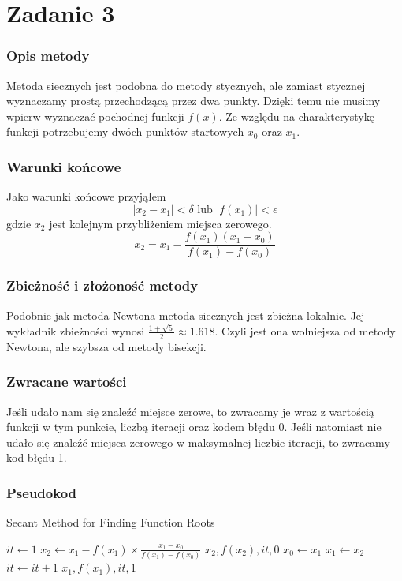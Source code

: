 \documentclass{article}
\begin{document}
\section*{Zadanie 3}
\subsubsection*{Opis metody}
Metoda siecznych jest podobna do metody stycznych, ale zamiast
stycznej wyznaczamy prostą przechodzącą przez dwa punkty. Dzięki
temu nie musimy wpierw wyznaczać pochodnej funkcji $f(x)$. Ze względu
na charakterystykę funkcji potrzebujemy dwóch punktów startowych
$x_0$ oraz $x_1$.

\subsubsection*{Warunki końcowe}
Jako warunki końcowe przyjąłem
\[
|x_2 - x_1| < \delta \text{{ lub }} |f(x_1)| < \epsilon
\]
gdzie $x_2$ jest kolejnym przybliżeniem miejsca zerowego.
\[
x_2 = x_1 - \frac{f(x_1)(x_1 - x_0)}{f(x_1) - f(x_0)}
\]

\subsubsection*{Zbieżność i złożoność metody}
Podobnie jak metoda Newtona metoda siecznych jest zbieżna lokalnie.
Jej wykładnik zbieżności wynosi $\frac{1 + \sqrt{5}}{2} \approx 1.618$.
Czyli jest ona wolniejsza od metody Newtona, ale szybsza od metody bisekcji.

\subsubsection*{Zwracane wartości}
Jeśli udało nam się znaleźć miejsce zerowe, to zwracamy je wraz z
wartością funkcji w tym punkcie, liczbą iteracji oraz kodem błędu 0.
Jeśli natomiast nie udało się znaleźć miejsca zerowego w maksymalnej
liczbie iteracji, to zwracamy kod błędu 1.

\subsubsection*{Pseudokod}
\begin{algorithm}[H]
  \caption{Secant Method for Finding Function Roots}
  \begin{algorithmic}[1]
      \State $it \gets 1$
          \State $x_2 \gets x_1 - f(x_1) \times \frac{x_1 - x_0}{f(x_1) - f(x_0)}$
              \State \Return $x_2, f(x_2), it, 0$
          \EndIf
          \State $x_0 \gets x_1$
          \State $x_1 \gets x_2$
          \State $it \gets it + 1$
      \EndWhile
      \State \Return $x_1, f(x_1), it, 1$
  \EndProcedure
  \end{algorithmic}
  \end{algorithm}
\end{document}
